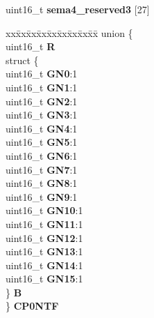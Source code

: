 \begin{DoxyCompactItemize}
\begin{tabbing}
\end{tabbing}\item 
\mbox{\label{structSEMA4__tag_a2539a512f0a1b67761af6fbfe04ee040}} 
uint16\+\_\+t {\bfseries sema4\+\_\+reserved3} \mbox{[}27\mbox{]}
\item 
\mbox{\label{structSEMA4__tag_ad2e88c264cd97a35ee81f8d84621d205}} 
\begin{tabbing}
xx\=xx\=xx\=xx\=xx\=xx\=xx\=xx\=xx\=\kill
union \{\\
\>uint16\_t {\bfseries R}\\
\>struct \{\\
\>\>uint16\_t {\bfseries GN0}:1\\
\>\>uint16\_t {\bfseries GN1}:1\\
\>\>uint16\_t {\bfseries GN2}:1\\
\>\>uint16\_t {\bfseries GN3}:1\\
\>\>uint16\_t {\bfseries GN4}:1\\
\>\>uint16\_t {\bfseries GN5}:1\\
\>\>uint16\_t {\bfseries GN6}:1\\
\>\>uint16\_t {\bfseries GN7}:1\\
\>\>uint16\_t {\bfseries GN8}:1\\
\>\>uint16\_t {\bfseries GN9}:1\\
\>\>uint16\_t {\bfseries GN10}:1\\
\>\>uint16\_t {\bfseries GN11}:1\\
\>\>uint16\_t {\bfseries GN12}:1\\
\>\>uint16\_t {\bfseries GN13}:1\\
\>\>uint16\_t {\bfseries GN14}:1\\
\>\>uint16\_t {\bfseries GN15}:1\\
\>\} {\bfseries B}\\
\} {\bfseries CP0NTF}\\


\end{tabbing}
\end{DoxyCompactItemize}
